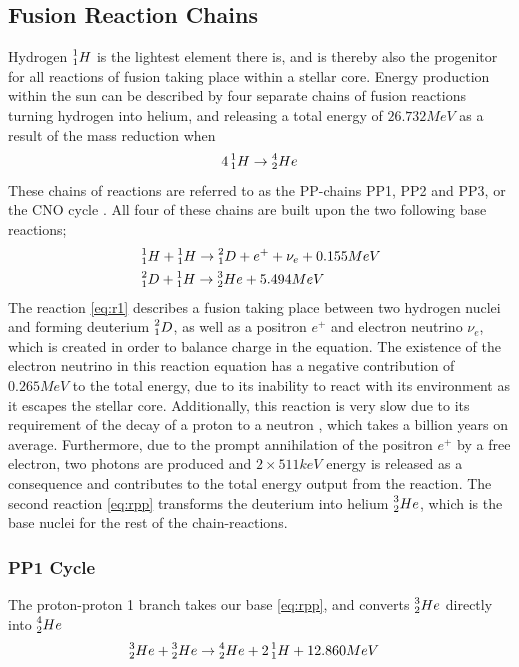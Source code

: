 \documentclass[10pt, nofootinbib, twocolumn]{revtex4-1}
\begin{document}
\subsection{Fusion Reaction Chains}
Hydrogen $\prescript{1}{1}H$ is the lightest element there is, and is thereby also the progenitor for all reactions of fusion taking place within a stellar core. Energy production within the sun can be described by four separate chains of fusion reactions turning hydrogen into helium, and releasing a total energy of $26.732 MeV$ as a result of the mass reduction when
$$4\prescript{1}{1}H\rightarrow \prescript{4}{2}He$$
These chains of reactions are referred to as the PP-chains PP1, PP2 and PP3, or the CNO cycle \cite{ast}. All four of these chains are built upon the two following base reactions;
\begin{align}
    &\prescript{1}{1}H+\prescript{1}{1}H\rightarrow \prescript{2}{1}D+e^++\nu_e+0.155MeV \label{eq:r1}\\
    &\prescript{2}{1}D+\prescript{1}{1}H\rightarrow\prescript{3}{2}He + 5.494MeV \label{eq:rpp}
\end{align}
The reaction \eqref{eq:r1} describes a fusion taking place between two hydrogen nuclei and forming deuterium $\prescript{2}{1}D$, as well as a positron $e^+$ and electron neutrino $\nu_e$, which is created in order to balance charge in the equation. The existence of the electron neutrino in this reaction equation has a negative contribution of $0.265MeV$ to the total energy, due to its inability to react with its environment as it escapes the stellar core. Additionally, this reaction is very slow due to its requirement of the decay of a proton to a neutron \cite{ast}, which takes a billion years on average. Furthermore, due to the prompt annihilation of the positron $e^+$ by a free electron, two photons are produced and $2\times 511keV$ energy is released as a consequence and contributes to the total energy output from the reaction. The second reaction \eqref{eq:rpp} transforms the deuterium into helium $\prescript{3}{2}He$, which is the base nuclei for the rest of the chain-reactions.


\subsubsection{PP1 Cycle}
The proton-proton 1 branch takes our base \eqref{eq:rpp}, and converts $\prescript{3}{2}He$ directly into $\prescript{4}{2}He$
\begin{align}
    & \prescript{3}{2}He+\prescript{3}{2}He\rightarrow\prescript{4}{2}He+2\prescript{1}{1}H + 12.860MeV \label{eq:r33}
\end{align}
\end{document}
